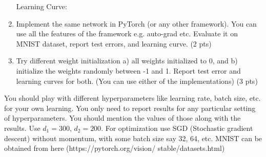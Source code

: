 \documentclass[a4paper]{article}
\theoremstyle{definition}
\newenvironment{soln}{
    \leavevmode\color{blue}\ignorespaces
}{}
\begin{document}
\begin{enumerate}
\begin{soln}
        Learning Curve:
    \end{soln}
    \item Implement the same network in PyTorch (or any other framework). You can use all the features of the framework e.g. auto-grad etc. Evaluate it on MNIST dataset, report test errors, and learning curve. (2 pts)
    
    \item Try different weight initialization a) all weights initialized to 0, and b) initialize the weights randomly between -1 and 1. Report test error and learning curves for both. (You can use either of the implementations) (3 pts)
\end{enumerate}

You should play with different hyperparameters like learning rate, batch size, etc. for your own learning. You only need to report results for any particular setting of hyperparameters. You should mention the values of those along with the results. Use $d_1 = 300$, $d_2 = 200$. For optimization use SGD (Stochastic gradient descent) without momentum, with some batch size say 32, 64, etc. MNIST can be obtained from here (https://pytorch.org/vision/ stable/datasets.html)


\end{document}
